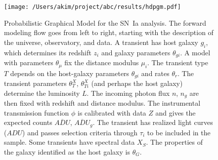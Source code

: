 \documentclass[preprint]{elsarticle}
\begin{document}
\begin{figure}[htbp] %
   \centering
   \texttt{[image: /Users/akim/project/abc/results/hdpgm.pdf]} 
   \caption{Probabilistic Graphical Model for the SN~Ia analysis.  
   The forward modeling
   flow goes from left to right, starting with the description of the universe, observatory,
   and data.    A transient has host galaxy $g_i$, which determines its redshift $z_i$
   and galaxy parameters $\theta_{gi}$.
   A model with parameters $\theta_\mu$ fix the distance modulus $\mu_i$.
   The transient type $T$ depends on the host-galaxy parameters  $\theta_{gi}$
   and rates $\theta_r$.   The transient
   parameters $\theta_T^X$, $\theta_{Ti}^X$ (and perhaps the host galaxy) determine the luminosity $L$.       The 
   incoming photon flux $n$, $n_g$  are then fixed
   with redshift and distance modulus.
   The instrumental transmission function $\phi$ is calibrated with data ${Z}$ and
   gives the expected
   counts $\overline{\mathit{ADU}}$, $\overline{\mathit{ADU}}_g$. 
   The transient has realized light curves (${ADU}$) and passes selection criteria
   through $\tau_i$ to be included in the sample.  Some transients have spectral data
   ${X}_S$.  The properties of the galaxy identified as the host galaxy is $\theta_G$. 
   \label{pgm:fig}}
\end{figure}
\end{document}
